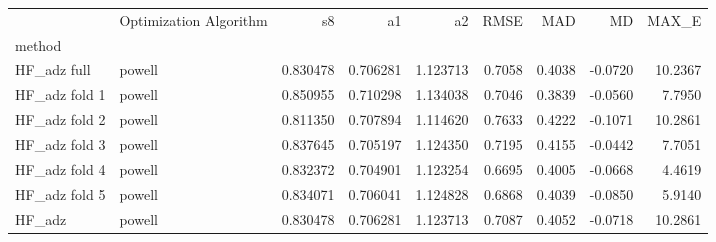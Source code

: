 \begin{tabular}{llrrrrrrr}
 & Optimization Algorithm & s8 & a1 & a2 & RMSE & MAD & MD & MAX_E \\
method &  &  &  &  &  &  &  &  \\
HF_adz full & powell & 0.830478 & 0.706281 & 1.123713 & 0.7058 & 0.4038 & -0.0720 & 10.2367 \\
HF_adz fold 1 & powell & 0.850955 & 0.710298 & 1.134038 & 0.7046 & 0.3839 & -0.0560 & 7.7950 \\
HF_adz fold 2 & powell & 0.811350 & 0.707894 & 1.114620 & 0.7633 & 0.4222 & -0.1071 & 10.2861 \\
HF_adz fold 3 & powell & 0.837645 & 0.705197 & 1.124350 & 0.7195 & 0.4155 & -0.0442 & 7.7051 \\
HF_adz fold 4 & powell & 0.832372 & 0.704901 & 1.123254 & 0.6695 & 0.4005 & -0.0668 & 4.4619 \\
HF_adz fold 5 & powell & 0.834071 & 0.706041 & 1.124828 & 0.6868 & 0.4039 & -0.0850 & 5.9140 \\
HF_adz & powell & 0.830478 & 0.706281 & 1.123713 & 0.7087 & 0.4052 & -0.0718 & 10.2861 \\
\end{tabular}
